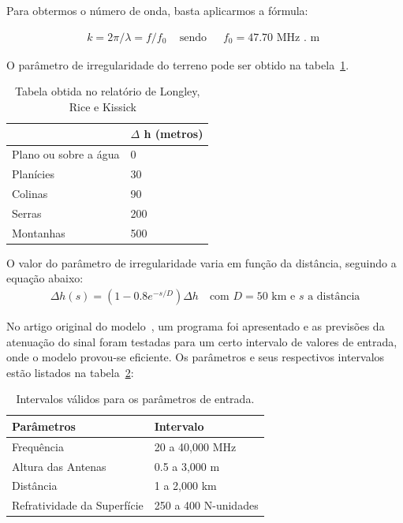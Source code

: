 Para obtermos o número de onda, basta aplicarmos a fórmula:


\begin{align}
  \label{wn} k = 2\pi/\lambda = f/f_0 \,\,\,\,\, \text{ sendo} \,\,\,\,\,\,\,\,\, f_0 = 47.70 \text{ MHz . m }
\end{align}


O parâmetro de irregularidade do terreno pode ser obtido na tabela~\ref{table:deltah}. \\

\begin{table}[h]
\centering
\caption[Valores para o parâmetro de irregularidade do terreno.]
{Tabela obtida no relatório de Longley, Rice  e Kissick ~\cite{longleyricedelta}} 
\label{table:deltah}
\begin{tabular}{ll}

\hline
                             & $\Delta$ h (metros) \\ \hline
Plano ou sobre a água        & 0                 \\
Planícies                    & 30                \\
Colinas                      & 90                \\
Serras                       & 200               \\
Montanhas                    & 500               
\end{tabular}
\end{table}


O valor do parâmetro de irregularidade varia em função da distância, seguindo a equação abaixo: 
\begin{align}
\label{deltaH} \Delta h(s) = (1-0.8e^{-s/D})\Delta h \,\,\,\, \text{ com $D = 50 $ km e $s$ a distância}
\end{align}

No artigo original do modelo~\cite{longleyrice}, um programa foi apresentado e as previsões da atenuação do sinal foram testadas para um certo intervalo de valores de entrada, onde o modelo provou-se eficiente. Os parâmetros e seus respectivos intervalos estão listados na tabela~\ref{table:longleyricevaluesinterval}:\\

\begin{table}[h]
\centering
\caption[Intervalos válidos para os parâmetros de entrada.]
{Intervalos válidos para os parâmetros de entrada.}
\label{table:longleyricevaluesinterval}
\begin{tabular}{ll}
\hline
Parâmetros                  & Intervalo            \\ \hline
Frequência                  & 20 a 40,000 MHz      \\
Altura das Antenas          & 0.5 a 3,000 m        \\
Distância                   & 1 a 2,000 km         \\
Refratividade da Superfície & 250 a 400 N-unidades
\end{tabular}
\end{table}


